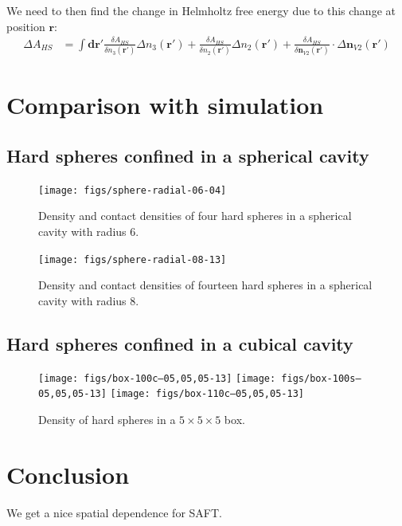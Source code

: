 \documentclass[letterpaper,twocolumn,amsmath,amssymb,prb]{revtex4-1}
\begin{document}
\begin{widetext}
We need to then find the change in Helmholtz free energy due to this
change at position $\mathbf{r}$:
\begin{align}
  \Delta A_{HS} &= \int \mathbf{dr}'
  \frac{\delta A_{HS}}{\delta n_3(\mathbf{r}')}\Delta n_3(\mathbf{r}')
  +
  \frac{\delta A_{HS}}{\delta n_2(\mathbf{r}')}\Delta n_2(\mathbf{r}')
  +
  \frac{\delta A_{HS}}{\delta \mathbf{n}_{V2}(\mathbf{r}')} \cdot \Delta \mathbf{n}_{V2}(\mathbf{r}')
\end{align}

\end{widetext}

\section{Comparison with simulation}

\subsection{Hard spheres confined in a spherical cavity}

\begin{figure}
  \texttt{[image: figs/sphere-radial-06-04]}
  \caption{Density and contact densities of four hard spheres in a
    spherical cavity with radius 6.}
  \label{fig:sphere-density}
\end{figure}

\begin{figure}
  \texttt{[image: figs/sphere-radial-08-13]}
  \caption{Density and contact densities of fourteen hard spheres in a
    spherical cavity with radius 8.}
  \label{fig:sphere-density2}
\end{figure}

\subsection{Hard spheres confined in a cubical cavity}

\begin{figure}
\texttt{[image: figs/box-100c--05,05,05-13]}
\texttt{[image: figs/box-100s--05,05,05-13]}
\texttt{[image: figs/box-110c--05,05,05-13]}
\caption{Density of hard spheres in a $5\times5\times5$ box.}
\label{fig:box-density}
\end{figure}


\section{Conclusion}
We get a nice spatial dependence for SAFT.
\end{document}
